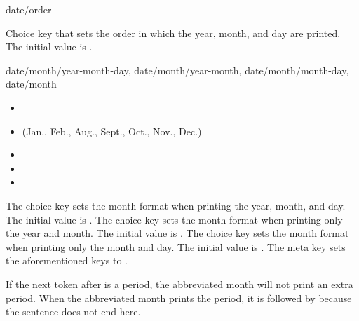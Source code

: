 \documentclass{beery}
\begin{document}
\begin{variable}{date/order}
  \begin{syntax}
  \end{syntax}
  Choice key that sets the order in which the year, month, and day are printed.
  The initial value is .
\end{variable}

\begin{variable}
    {
      date/month/year-month-day,
      date/month/year-month,
      date/month/month-day,
      date/month
    }
  \begin{syntax}
  \end{syntax}
  \begin{itemize}
    \item {}
    \item {} (Jan., Feb., Aug., Sept., Oct., Nov., Dec.)
    \item {}
    \item {}
    \item {}
  \end{itemize}
  The choice key  sets the month format when printing the year, month, and day.
  The initial value is .
  The choice key  sets the month format when printing only the year and month.
  The initial value is .
  The choice key  sets the month format when printing only the month and day.
  The initial value is .
  The meta key  sets the aforementioned keys to .

  If the next token after  is a period, the abbreviated month will not print an extra period.
  When the abbreviated month prints the period, it is followed by  because the sentence does not end here.
\end{variable}

\end{document}
